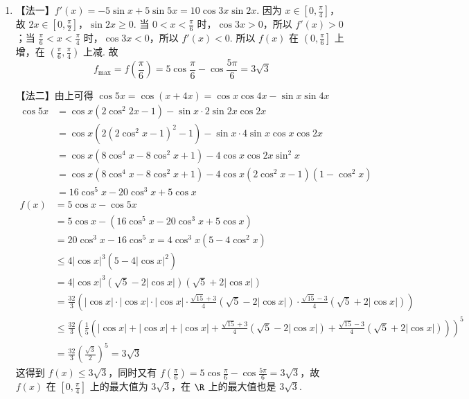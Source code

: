 \documentclass[UTF8,a4paper,oneside,11pt]{ctexbook}
\begin{document}
\begin{solution}
\begin{enumerate}
\item 【法一】\(f'(x) = -5\sin x + 5\sin 5x = 10\cos 3x\sin 2x\). 因为 \(x \in \left[0, \frac{\pi}{4}\right]\)，故 \(2x \in \left[0, \frac{\pi}{2}\right]\)，\(\sin 2x \ge 0\). 当 \(0 < x < \frac{\pi}{6}\) 时，\(\cos 3x > 0\)，所以 \(f'(x) > 0\)；当 \(\frac{\pi}{6} < x < \frac{\pi}{4}\) 时，\(\cos 3x < 0\)，所以 \(f'(x) < 0\). 所以 \(f(x)\) 在 \(\left(0, \frac{\pi}{6}\right]\) 上增，在 \(\left(\frac{\pi}{6}, \frac{\pi}{4}\right)\) 上减. 故
\[
f_{\max} = f\left(\frac{\pi}{6}\right) = 5\cos \frac{\pi}{6} - \cos \frac{5\pi}{6} = 3\sqrt{3}
\]

【法二】由上可得 \(\cos 5x = \cos (x + 4x)=\cos x\cos 4x-\sin x\sin 4x\)
\begin{align*}
\cos 5x &= \cos x (2\cos^2 2x - 1) - \sin x \cdot 2\sin 2x \cos 2x \\
&= \cos x (2(2\cos^2 x - 1)^2 - 1) - \sin x \cdot 4 \sin x \cos x \cos 2x \\
&= \cos x (8\cos^4 x - 8\cos^2 x + 1) - 4\cos x \cos 2x \sin^2 x \\
&= \cos x\left(8\cos^4 x - 8\cos^2 x + 1\right) - 4\cos x(2\cos^2 x - 1)(1-\cos^2 x) \\
&= 16\cos^5 x - 20\cos^3 x + 5\cos x
\end{align*}
\begin{align*}
f(x) &= 5\cos x - \cos 5x \\
&= 5\cos x - (16\cos^5 x - 20\cos^3 x + 5\cos x) \\
&= 20\cos^3 x - 16\cos^5 x=4\cos^3 x(5 - 4\cos^2 x) \\
&\le 4|\cos x|^3(5 - 4|\cos x|^2) \\
&= 4|\cos x|^3(\sqrt{5} - 2|\cos x|)(\sqrt{5} + 2|\cos x|) \\
&= \frac{32}{3}\left(|\cos x| \cdot |\cos x| \cdot |\cos x| \cdot \frac{\sqrt{15} + 3}{4}(\sqrt{5} - 2|\cos x|) \cdot \frac{\sqrt{15} - 3}{4}(\sqrt{5} + 2|\cos x|)\right) \\
&\le \frac{32}{3}\left(\frac{1}{5}\left(|\cos x| + |\cos x| + |\cos x| + \frac{\sqrt{15} + 3}{4}(\sqrt{5} - 2|\cos x|) + \frac{\sqrt{15} - 3}{4}(\sqrt{5} + 2|\cos x|)\right)\right)^5 \\
&= \frac{32}{3}\left(\frac{\sqrt{3}}{2}\right)^5 = 3\sqrt{3}
\end{align*}
这得到 \(f(x) \le 3\sqrt{3}\)，同时又有 \(f\left(\frac{\pi}{6}\right) = 5\cos \frac{\pi}{6} - \cos \frac{5\pi}{6} = 3\sqrt{3}\)，故 \(f(x)\) 在 \(\left[0, \frac{\pi}{4}\right]\) 上的最大值为 \(3\sqrt{3}\)，在 \(\R\) 上的最大值也是 \(3\sqrt{3}\).


\end{enumerate}
\end{solution}
\end{document}
